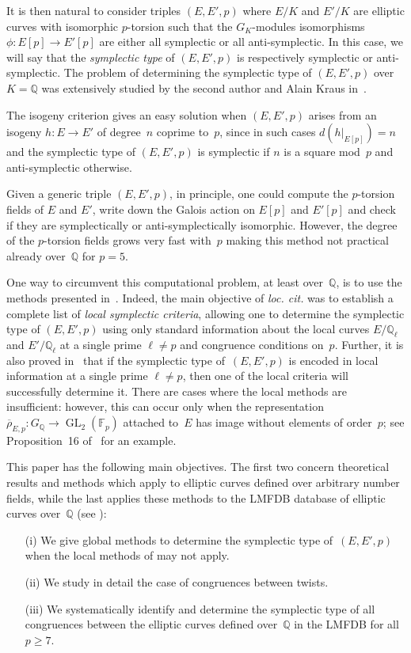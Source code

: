 \documentclass[twoside,leqno,symbols-for-thanks, draft]{rmi}
\numberwithin{equation}{section}
\newcommand{\Fp}{\mathbb{F}_p}
\newcommand{\Q}{\mathbb{Q}}
\newcommand{\rhobar}{{\overline{\rho}}}
\newcommand{\GL}{\operatorname{GL}}
\theoremstyle{remark}
\begin{document}
It is then natural to consider triples $(E,E',p)$ where $E/K$ and
$E'/K$ are elliptic curves with isomorphic $p$-torsion such that the
$G_K$-modules isomorphisms $\phi : E[p] \rightarrow E'[p]$ are either
all symplectic or all anti-symplectic.  In this case, we will say that
the {\em symplectic type} of $(E,E',p)$ is respectively symplectic or
anti-symplectic.  The problem of determining the symplectic type of
$(E,E',p)$ over~$K=\Q$ was extensively studied by the second author
and Alain Kraus in~\cite{FKSym}.

The isogeny criterion gives an easy solution when $(E,E',p)$
arises from an isogeny $h \colon E \to E'$ of degree~$n$ coprime
to~$p$, since in such cases $d(h|_{E[p]}) = n$ and the symplectic type
of $(E,E',p)$ is symplectic if $n$ is a square mod~$p$ and
anti-symplectic otherwise.

Given a generic triple $(E, E', p)$, in principle, one
could compute the $p$-torsion fields of $E$ and $E'$,
write down the Galois action on $E[p]$ and $E'[p]$ and check if they
are symplectically or anti-symplectically isomorphic. However, the
degree of the $p$-torsion fields grows very fast with~$p$ making this
method not practical already over~$\Q$ for $p = 5$.

One way to circumvent this computational problem, at least over~$\Q$, is to use the methods
presented in~\cite{FKSym}. Indeed, the main objective of {\it loc. cit.} was to establish a complete list of {\em local symplectic criteria},
allowing one to determine the symplectic type of $(E,E',p)$ using only
standard information about the local curves $E/\Q_\ell$ and
$E'/\Q_\ell$ at a single prime $\ell \neq p$ and congruence conditions
on~$p$. Further, it is also proved in~\cite{FKSym}  that if the
symplectic type of~$(E,E',p)$ is encoded in local information at a
single prime $\ell \neq p$, then one of the local criteria will
successfully determine it.  
There are cases where the local methods
are insufficient: however, this can occur only when 
the representation~$\rhobar_{E,p} : G_\Q \to \GL_2(\Fp)$ attached to~$E$ 
has image without elements of order~$p$;
see Proposition~16 of~\cite{FKSym} for an example.

This paper has the following main objectives. The first two concern
theoretical results and methods which apply to elliptic curves defined
over arbitrary number fields, while the last applies these methods to
the LMFDB database of elliptic curves over~$\Q$ (see \cite{lmfdb}):
\begin{itemize}
 \item[(i)] We give global methods to determine the symplectic type
   of~$(E,E',p)$ when the local methods of \cite{FKSym} may not apply.
 \item[(ii)] We study in detail the case of congruences between twists.
\item[(iii)] We systematically identify and determine the symplectic
  type of all congruences between the elliptic curves defined
  over~$\Q$ in the LMFDB for all~$p\ge7$.
\end{itemize}
\end{document}
